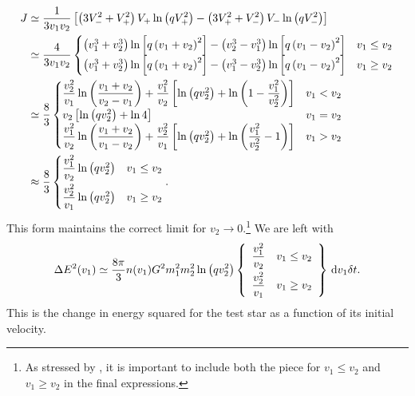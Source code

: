 \begin{align}
J \simeq {} & \recip{3 v_1 v_2} \left[\left(3V_-^2 + V_+^2\right)V_+\ln\left(qV_+^2\right) - \left(3V_+^2 + V_-^2\right)V_-\ln\left(qV_-^2\right)\right] \nonumber \\
 \simeq {} & \dfrac{4}{3v_1v_2}\begin{cases}
\left(v_1^3 + v_2^3\right)\ln\left[q\left(v_1 + v_2\right)^2\right] - \left(v_2^3 - v_1^3\right)\ln\left[q\left(v_1 - v_2\right)^2\right] & v_1 \leq v_2 \\
\left(v_1^3 + v_2^3\right)\ln\left[q\left(v_1 + v_2\right)^2\right] - \left(v_1^3 - v_2^3\right)\ln\left[q\left(v_1 - v_2\right)^2\right] & v_1 \geq v_2
\end{cases} \nonumber \\
 \simeq {} & \dfrac{8}{3}\begin{cases}
\dfrac{v_2^2}{v_1}\ln\left(\dfrac{v_1 + v_2}{v_2 - v_1}\right) + \dfrac{v_1^2}{v_2}\left[\ln\left(qv_2^2\right) + \ln\left(1 - \dfrac{v_1^2}{v_2^2}\right)\right] & v_1 < v_2 \\
v_2\left[\ln\left(qv_2^2\right) + \ln 4\right] & v_1 = v_2\\
\dfrac{v_1^2}{v_2}\ln\left(\dfrac{v_1 + v_2}{v_1 - v_2}\right) + \dfrac{v_2^2}{v_1}\left[\ln\left(qv_2^2\right) + \ln\left(\dfrac{v_1^2}{v_2^2} - 1\right)\right] & v_1 > v_2
\end{cases} \nonumber \\
\approx {} & \dfrac{8}{3}\begin{cases}
\dfrac{v_1^2}{v_2}\ln\left(qv_2^2\right)\vspace{1.0mm} & v_1 \leq v_2 \\
\dfrac{v_2^2}{v_1}\ln\left(qv_2^2\right) & v_1 \geq v_2
\end{cases}.
\end{align}
This form maintains the correct limit for $v_2 \rightarrow 0$.\footnote{As stressed by \citet{Antonini2011}, it is important to include both the piece for $v_1 \leq v_2$ and $v_1 \geq v_2$ in the final expressions.} We are left with
\begin{equation}
\Delta E^2(v_1) \simeq \dfrac{8\pi}{3} n(v_1)G^2m_1^2 m_2^2\ln\left(qv_2^2\right)\left\{\begin{array}{lr}\dfrac{v_1^2}{v_2}\vspace{1.0mm} & v_1 \leq v_2\\ \dfrac{v_2^2}{v_1} & v_1 \geq v_2 \end{array}\right\}\,\dd v_1\delta t.
\end{equation}
This is the change in energy squared for the test star as a function of its initial velocity.
